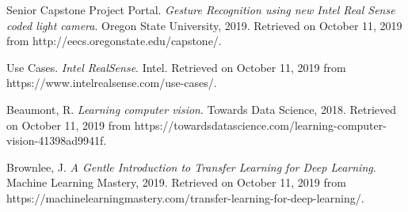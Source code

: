 \documentclass[onecolumn, draftclsnofoot,10pt, compsoc]{IEEEtran}
\begin{document}
\begin{thebibliography}{9}

Senior Capstone Project Portal. 
\textit{Gesture Recognition using new Intel Real Sense coded light camera}. 
Oregon State University, 2019. Retrieved on October 11, 2019 from http://eecs.oregonstate.edu/capstone/.

Use Cases. 
\textit{Intel RealSense}. 
Intel. Retrieved on October 11, 2019 from https://www.intelrealsense.com/use-cases/.

Beaumont, R. 
\textit{Learning computer vision}. 
Towards Data Science, 2018. Retrieved on October 11, 2019 from https://towardsdatascience.com/learning-computer-vision-41398ad9941f.

Brownlee, J. 
\textit{A Gentle Introduction to Transfer Learning for Deep Learning}. 
Machine Learning Mastery, 2019. Retrieved on October 11, 2019 from https://machinelearningmastery.com/transfer-learning-for-deep-learning/.


\end{thebibliography}
\end{document}
